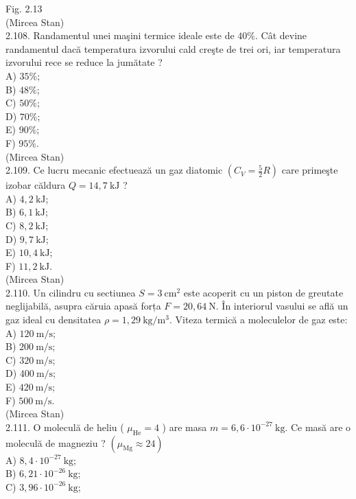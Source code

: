 \documentclass[10pt]{article}
\begin{document}
Fig. 2.13\\
(Mircea Stan)\\
2.108. Randamentul unei maşini termice ideale este de $40 \%$. Cât devine randamentul dacă temperatura izvorului cald creşte de trei ori, iar temperatura izvorului rece se reduce la jumătate ?\\
A) $35 \%$;\\
B) $48 \%$;\\
C) $50 \%$;\\
D) $70 \%$;\\
E) $90 \%$;\\
F) $95 \%$.\\
(Mircea Stan)\\
2.109. Ce lucru mecanic efectuează un gaz diatomic $\left(C_{V}=\frac{5}{2} R\right)$ care primeşte izobar căldura $Q=14,7 \mathrm{~kJ}$ ?\\
A) $4,2 \mathrm{~kJ}$;\\
B) $6,1 \mathrm{~kJ}$;\\
C) $8,2 \mathrm{~kJ}$;\\
D) $9,7 \mathrm{~kJ}$;\\
E) $10,4 \mathrm{~kJ}$;\\
F) $11,2 \mathrm{~kJ}$.\\
(Mircea Stan)\\
2.110. Un cilindru cu sectiunea $S=3 \mathrm{~cm}^{2}$ este acoperit cu un piston de greutate neglijabilă, asupra căruia apasă forța $F=20,64 \mathrm{~N}$. În interiorul vasului se află un gaz ideal cu densitatea $\rho=1,29 \mathrm{~kg} / \mathrm{m}^{3}$. Viteza termică a moleculelor de gaz este:\\
A) $120 \mathrm{~m} / \mathrm{s}$;\\
B) $200 \mathrm{~m} / \mathrm{s}$;\\
C) $320 \mathrm{~m} / \mathrm{s}$;\\
D) $400 \mathrm{~m} / \mathrm{s}$;\\
E) $420 \mathrm{~m} / \mathrm{s}$;\\
F) $500 \mathrm{~m} / \mathrm{s}$.\\
(Mircea Stan)\\
2.111. O moleculă de heliu ( $\mu_{\mathrm{He}}=4$ ) are masa $m=6,6 \cdot 10^{-27} \mathrm{~kg}$. Ce masă are o moleculă de magneziu ? $\left(\mu_{\mathrm{Mg}} \approx 24\right)$\\
A) $8,4 \cdot 10^{-27} \mathrm{~kg}$;\\
B) $6,21 \cdot 10^{-26} \mathrm{~kg}$;\\
C) $3,96 \cdot 10^{-26} \mathrm{~kg}$;\\
\end{document}
